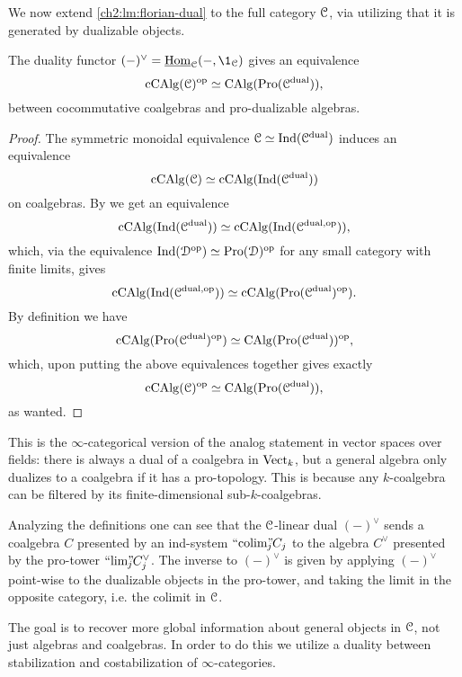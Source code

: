 We now extend \cref{ch2:lm:florian-dual} to the full category $\EuScript{C}$, via utilizing that it is generated by dualizable objects. 

\begin{lemma}
    \label{ch2:lm:sweedler-duality}
    The duality functor $(-)^\vee = \iHom_\C(-,\1_\C)$ gives an equivalence 
    \[\operatorname{cCAlg}(\EuScript{C})^{\mathrm{op}}\simeq \operatorname{CAlg}(\operatorname{Pro}(\EuScript{C}^{\mathrm{dual}})),\]
    between cocommutative coalgebras and pro-dualizable algebras.
\end{lemma}
\begin{proof}
    The symmetric monoidal equivalence $\EuScript{C}\simeq \operatorname{Ind}(\EuScript{C}^{\mathrm{dual}})$ induces an equivalence 
    \[\operatorname{cCAlg}(\EuScript{C}) \simeq \operatorname{cCAlg}(\operatorname{Ind}(\EuScript{C}^{\mathrm{dual}}))\]
    on coalgebras. By \cite[3.2.4]{lurie_2018_ELL1} we get an equivalence 
    \[\operatorname{cCAlg}(\operatorname{Ind}(\EuScript{C}^{\mathrm{dual}}))\simeq \operatorname{cCAlg}(\operatorname{Ind}(\EuScript{C}^{\mathrm{dual}, \mathrm{op}})),\]
    which, via the equivalence $\operatorname{Ind}(\EuScript{D}^{\mathrm{op}})\simeq \operatorname{Pro}(\EuScript{D})^{\mathrm{op}}$ for any small category with finite limits, gives 
    \[\operatorname{cCAlg}(\operatorname{Ind}(\EuScript{C}^{\mathrm{dual}, \mathrm{op}}))\simeq \operatorname{cCAlg}(\operatorname{Pro}(\EuScript{C}^{\mathrm{dual}})^{\mathrm{op}}).\]
    By definition we have 
    \[\operatorname{cCAlg}(\operatorname{Pro}(\EuScript{C}^{\mathrm{dual}})^{\mathrm{op}})\simeq \operatorname{CAlg}(\operatorname{Pro}(\EuScript{C}^{\mathrm{dual}}))^{\mathrm{op}},\]
    which, upon putting the above equivalences together gives exactly 
    \[\operatorname{cCAlg}(\EuScript{C})^{\mathrm{op}}\simeq \operatorname{CAlg}(\operatorname{Pro}(\EuScript{C}^{\mathrm{dual}})),\]
    as wanted. 
\end{proof}

\begin{remark}
    This is the $\infty$-categorical version of the analog statement in vector spaces over fields: there is always a dual of a coalgebra in $\mathrm{Vect}_k$, but a general algebra only dualizes to a coalgebra if it has a pro-topology. This is because any $k$-coalgebra can be filtered by its finite-dimensional sub-$k$-coalgebras. 
\end{remark}

\begin{remark}
    \label{ch2:rm:coalebra-in-Ind}
    Analyzing the definitions one can see that the $\EuScript{C}$-linear dual $(-)^\vee$ sends a coalgebra $C$ presented by an ind-system $``\!\operatorname{colim}\!"_{\hspace{-5pt} j} C_j$ to the algebra $C^\vee$ presented by the pro-tower $``\!\lim\!"_{\hspace{-5pt} j} C_j^\vee$. The inverse to $(-)^\vee$ is given by applying $(-)^\vee$ point-wise to the dualizable objects in the pro-tower, and taking the limit in the opposite category, i.e. the colimit in $\EuScript{C}$. 
\end{remark}

The goal is to recover more global information about general objects in $\EuScript{C}$, not just algebras and coalgebras. In order to do this we utilize a duality between stabilization and costabilization of $\infty$-categories. 


